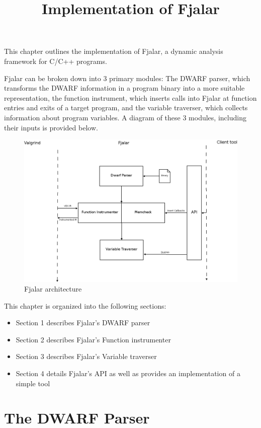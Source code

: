 \documentclass[11pt]{article}
\title{Implementation of Fjalar}
\date{}
\author{}
\begin{document}
 \maketitle
This chapter outlines the implementation of Fjalar, a dynamic analysis
framework for C/C++ programs. 

Fjalar can be broken down into 3 primary modules: The DWARF parser,
which transforms the DWARF information in a program
binary into a more suitable representation, the function
instrument, which inserts calls into Fjalar at function entries and
exits of a target program, and the variable traverser, which
collects information about program variables. A diagram of these 3
modules, including their inputs is provided below.

\begin{figure}
\noindent
\centering
\includegraphics[width=150mm]{fjalar-arch-initial.png}
\caption{Fjalar architecture}
\end{figure}

This chapter is organized into the following sections: 

\begin{itemize}
\item Section 1 describes Fjalar's DWARF parser
\item Section 2 describes Fjalar's Function instrumenter
\item Section 3 describes Fjalar's Variable traverser
\item Section 4 details Fjalar's API as well as provides an
  implementation of a simple tool
\end{itemize}

\section{The DWARF Parser}
\end{document}
